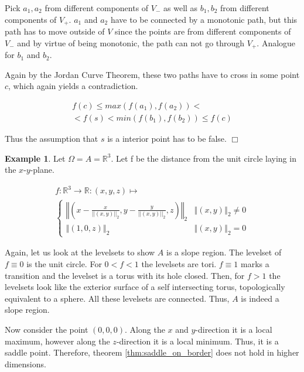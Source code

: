 \documentclass[11pt,twoside,twocolumn,a4paper]{article}
\theoremstyle{plain}
\theoremstyle{definition}
\newtheorem{exmp}[thm]{Example} %
\begin{document}
Pick $a_1, a_2$ from different components of $V_-$ as well as $b_1, b_2$ from different components of $V_+$.
$a_1$ and $a_2$ have to be connected by a monotonic path, but this path has to move outside of $V$ since the points are from different components of $V_-$ and by virtue of being monotonic, the path can not go through $V_+$.
Analogue for $b_1$ and $b_2$.

Again by the Jordan Curve Theorem, these two paths have to cross in some point $c$, which again yields a contradiction.

\begin{multline*}
f(c) \leq max(f(a_1), f(a_2)) < \\
< f(s) < min(f(b_1), f(b_2)) \leq f(c)
\end{multline*}

Thus the assumption that $s$ is a interior point has to be false.
\hfill $\Box$

\begin{exmp}
Let $\Omega = A = \mathbb R^3$.
Let f be the distance from the unit circle laying in the $x$-$y$-plane. 

\begin{multline*}
f: \mathbb R^3 \to \mathbb R: (x,y,z) \mapsto \\
\begin{cases}
\left\Vert\left(x - \frac{x}{||\left(x,y\right)||_2}, y - \frac{y}{||\left(x,y\right)||_2}, z\right)\right\Vert_2 & \left\Vert(x,y)\right\Vert_2 \neq 0 \\
\left\Vert(1, 0, z)\right\Vert_2 & \left\Vert(x,y)\right\Vert_2 = 0
\end{cases}
\end{multline*}

Again, let us look at the levelsets to show $A$ is a slope region.
The levelset of $f \equiv 0$ is the unit circle. For $0 < f < 1$ the levelsets are tori.
$f \equiv 1$ marks a transition and the levelset is a torus with its hole closed.
Then, for $f > 1$ the levelsets look like the exterior surface of a self intersecting torus, topologically equivalent to a sphere.
All these levelsets are connected.
Thus, $A$ is indeed a slope region.

Now consider the point $(0,0,0)$.
Along the $x$ and $y$-direction it is a local maximum, however along the $z$-direction it is a local minimum.
Thus, it is a saddle point.
Therefore, theorem \ref{thm:saddle_on_border} does not hold in higher dimensions.
\end{exmp}
\end{document}
